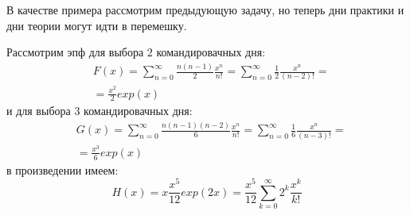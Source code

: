 В качестве примера рассмотрим предыдующую задачу, но теперь дни практики и дни теории могут идти в перемешку.

Рассмотрим эпф для выбора 2 командировачных дня:
\[
	\begin{split}
		& F\left(x\right) = \sum_{n=0}^\infty \frac{n\left(n-1\right)}{2} \frac{x^n}{n!} = \sum_{n=0}^\infty \frac{1}{2} \frac{x^n}{\left(n-2\right)!} = \\
		& = \frac{x^2}{2} exp\left(x\right)
	\end{split}
\]
и для выбора 3 командировачных дня:
\[
	\begin{split}
		& G\left(x\right) = \sum_{n=0}^\infty \frac{n\left(n-1\right)\left(n-2\right)}{6} \frac{x^n}{n!} = \sum_{n=0}^\infty \frac{1}{6} \frac{x^n}{\left(n-3\right)!} = \\
		& = \frac{x^3}{6} exp\left(x\right)
	\end{split}
\]
в произведении имеем:
\[
	H\left(x\right) = x\frac{x^5}{12} exp\left(2x\right) = \frac{x^5}{12} \sum_{k=0}^\infty 2^k \frac{x^k}{k!}
\]
